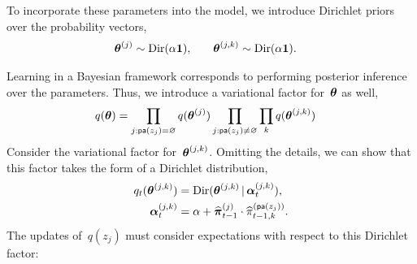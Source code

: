 To incorporate these parameters into the model, we introduce Dirichlet priors
over the probability vectors,
\begin{align*}
  \boldsymbol{\theta}^{(j)} &\sim \mathrm{Dir}(\alpha \boldsymbol{1}), & & &
  \boldsymbol{\theta}^{(j,k)} &\sim \mathrm{Dir}(\alpha \boldsymbol{1}).
\end{align*}

Learning in a Bayesian framework corresponds to performing posterior
inference over the parameters. Thus, we introduce a variational factor
for~$\boldsymbol{\theta}$ as well,
\begin{align*}
  q(\boldsymbol{\theta}) &=
  \prod_{j: \mathsf{pa}(z_j)=\varnothing} q(\boldsymbol{\theta}^{(j)})
  \prod_{j: \mathsf{pa}(z_j)\neq \varnothing} \prod_{k} q(\boldsymbol{\theta}^{(j,k)})
\end{align*}
Consider the variational factor for~$\boldsymbol{\theta}^{(j,k)}$.  Omitting the
details, we can show that this factor takes the form of a Dirichlet
distribution,
\begin{align*}
  q_t(\boldsymbol{\theta}^{(j,k)}) &=
  \mathrm{Dir}(\boldsymbol{\theta}^{(j,k)} \,|\, \boldsymbol{\alpha}_{t}^{(j,k)}), \\
  \boldsymbol{\alpha}_{t}^{(j,k)} &= \alpha + \widehat{\boldsymbol{\pi}}_{t-1}^{(j)} \cdot \widehat{\pi}_{t-1,k}^{(\mathsf{pa}(z_j))}.
\end{align*}
The updates of~$q(z_j)$ must consider expectations with respect to
this Dirichlet factor:
